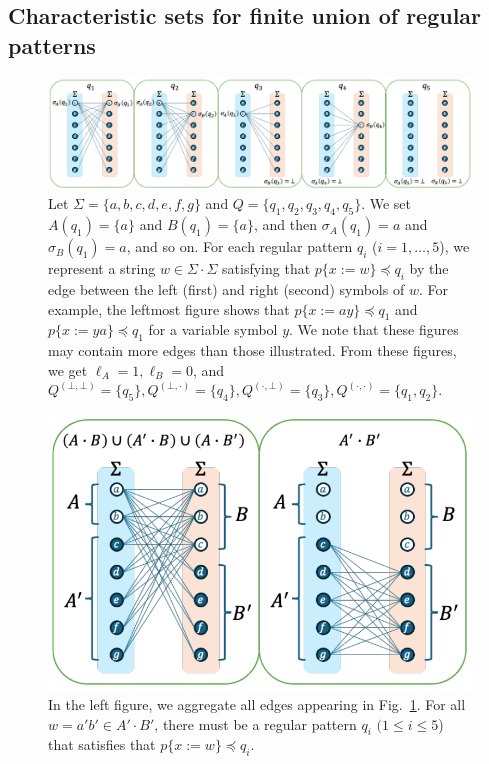 \subsection{Characteristic sets for finite union of regular patterns}\label{subsec:char_union}

\begin{figure}[t]
  \begin{center}
    \includegraphics[scale=0.54]{figs/lem8eachreg.pdf}
    \caption{Let $\Sigma=\{a,b,c,d,e,f,g\}$ {\color{red} and } $Q=\{q_1,q_2,q_3,q_4,q_5\}$. 
    We set $A(q_1)=\{a\}$ and $B(q_1)=\{a\}$, and then $\sigma_A(q_1)=a$ and $\sigma_B(q_1)=a$, and so on. For each regular pattern $q_i$ ($i=1,\ldots,5$), we represent a string $w \in \Sigma\cdot\Sigma$ satisfying that $p\{x:=w\}\preceq q_i$ by the edge between the left (first) and right (second) symbols of $w$. For example, the leftmost figure shows that $p\{x:=ay\}\preceq q_1$ and $p\{x:=ya\}\preceq q_1$ for a variable symbol $y$. We note that these figures may contain more edges than those illustrated. From these figures, we get $\ell_A=1, \ell_B=0$, and $Q^{(\bot,\bot)}=\{q_5\}, Q^{(\bot,\cdot)}=\{q_4\}, Q^{(\cdot,\bot)}=\{q_3\}, Q^{(\cdot,\cdot)}=\{q_1,q_2\}$.}\label{fig:lem8eachreg}
  \end{center}
\end{figure}

\begin{figure}[t]
  \begin{center}
    \includegraphics[scale=0.525]{figs/lem8totalreg.pdf}
    \caption{In the left figure, we aggregate all edges appearing in Fig.~\ref{fig:lem8eachreg}. For all $w=a'b'\in A'\cdot B'$, there must be a regular pattern $q_i$ $(1\leq i\leq 5$) that satisfies that $p \{ x:=w \} \preceq q_i$.}\label{fig:lem8totalreg}
  \end{center}
\end{figure}


